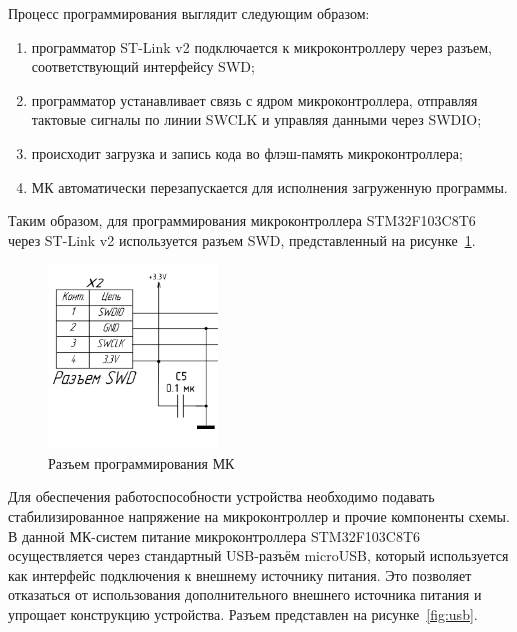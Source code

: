 Процесс программирования выглядит следующим образом:

\begin{enumerate}
    \item программатор ST-Link v2 подключается к микроконтроллеру через разъем, соответствующий интерфейсу SWD;
    \item программатор устанавливает связь с ядром микроконтроллера, отправляя тактовые сигналы по линии SWCLK и управляя данными через SWDIO;
    \item происходит загрузка и запись кода во флэш-память микроконтроллера;
    \item МК автоматически перезапускается для исполнения загруженную программы.
\end{enumerate}

Таким образом, для программирования микроконтроллера STM32F103C8T6 через ST-Link v2 используется разъем SWD, представленный на рисунке~\ref{fig:swd}.

\begin{figure}[H]
    \centering
    \includegraphics[width=0.4\textwidth]{images/design/swd}
    \caption{\centering Разъем программирования МК}
    \label{fig:swd}
\end{figure}


Для обеспечения работоспособности устройства необходимо подавать стабилизированное напряжение на микроконтроллер и прочие компоненты схемы.
В данной МК-систем питание микроконтроллера STM32F103C8T6 осуществляется через стандартный USB-разъём microUSB, который используется как интерфейс подключения к внешнему источнику питания.
Это позволяет отказаться от использования дополнительного внешнего источника питания и упрощает конструкцию устройства.
Разъем представлен на рисунке~\ref{fig:usb}.

